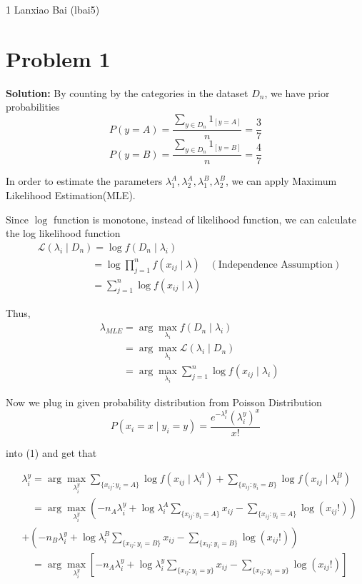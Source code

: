 \documentclass[11pt]{article}
\begin{document}
\homework
    {1}
    {Lanxiao Bai (lbai5)}
    {}

\section*{Problem 1}
\textbf{Solution:} 
By counting by the categories in the dataset $D_n$, we have prior probabilities
\[P(y = A) = \frac{\sum_{y \in D_n}1_{[y = A]}}{n} = \frac{3}{7}\]
\[P(y = B) = \frac{\sum_{y \in D_n}1_{[y = B]}}{n} = \frac{4}{7}\]

In order to estimate the parameters $\lambda^A_1, \lambda^A_2, \lambda^B_1, \lambda^B_2$, we can apply Maximum Likelihood Estimation(MLE).

Since $\log$ function is monotone, instead of likelihood function, we can calculate the log likelihood function
\begin{align}
	&\mathcal{L}(\lambda_i \mid D_n) = \log f(D_n \mid \lambda_i)\nonumber\\
	&\phantom{\mathcal{L}(\lambda_i \mid x_{ij})} = \log \prod_{j = 1}^n f(x_{ij} \mid \lambda)&(\text{Independence Assumption})\nonumber\\
	&\phantom{\mathcal{L}(\lambda_i \mid x_{ij})} = \sum_{j = 1}^n \log f(x_{ij} \mid \lambda)\nonumber
\end{align}

Thus, 
\begin{align}
	&\lambda_{MLE} = \arg \max_{\lambda_i} f(D_n \mid \lambda_i)\nonumber\\
	&\phantom{\lambda_{MLE}} = \arg \max_{\lambda_i} \mathcal{L}(\lambda_i \mid D_n)\nonumber\\
	&\phantom{\lambda_{MLE}} = \arg\max_{\lambda_i} \sum_{j = 1}^n \log f(x_{ij} \mid \lambda_i)
\end{align}

Now we plug in given probability distribution from Poisson Distribution
\[P(x_i = x \mid y_i = y) = \frac{e^{-\lambda_i^y}(\lambda_i^y)^x}{x!}\]

into (1) and get that

\begin{align}
	&\lambda_{i}^y = \arg\max_{\lambda_i^y} \sum_{\{x_{ij} : y_i = A\}} \log f(x_{ij} \mid \lambda_i^A) + \sum_{\{x_{ij} : y_i = B\}} \log f(x_{ij} \mid \lambda_i^B)\nonumber\\
	&\phantom{\lambda_{i}^y} = \arg\max_{\lambda_i^y} (-n_A\lambda^y_{i} + \log \lambda^A_{i}\sum_{\{x_{ij} : y_i = A\}} x_{ij} - \sum_{\{x_{ij} : y_i = A\}}\log (x_{ij}!)) \nonumber\\
	& + (-n_B\lambda^y_{i} + \log \lambda^B_{i}\sum_{\{x_{ij} : y_i = B\}} x_{ij} - \sum_{\{x_{ij} : y_i = B\}}\log (x_{ij}!)) \nonumber\\
	&\phantom{\lambda_{i}^y} = \arg\max_{\lambda_i^y} \left[-n_A\lambda^y_{i} + \log \lambda^y_{i}\sum_{\{x_{ij} : y_i = y\}} x_{ij} - \sum_{\{x_{ij} : y_i = y\}}\log (x_{ij}!)\right]\nonumber
\end{align}
\end{document}
